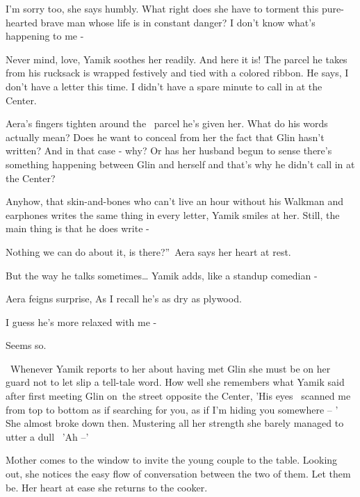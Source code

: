 \documentclass[12pt]{book}
\begin{document}
{\textquotedbl}I'm sorry too,{\textquotedbl} she says humbly. What right does she have to torment this pure-hearted
brave man whose life is in constant danger? {\textquotedbl}I don't know what's happening to me -{\textquotedbl}

{\textquotedbl}Never mind, love,{\textquotedbl} Yamik soothes her readily. {\textquotedbl}And here it is!{\textquotedbl}
The parcel he takes from his rucksack is wrapped festively and tied with a colored ribbon. He says, {\textquotedbl}I
don't have a letter this time. I didn't have a spare minute to call in at the Center.{\textquotedbl}

Aera's fingers tighten around the \ parcel he's given her. What do his words actually mean? Does he want to conceal from
her the fact that Glin hasn't written? And in that case - why? Or has her husband begun to sense there's something
happening between Glin and herself and that's why he didn't call in at the Center?

{\textquotedbl}Anyhow, that skin-and-bones who can't live an hour without his Walkman and earphones writes the same
thing in every letter, {\textquotedbl} Yamik smiles at her. {\textquotedbl}Still, the main thing is that he does write
-{\textquotedbl}

{\textquotedbl}Nothing we can do about it, is there?''~Aera says her heart at rest.

{\textquotedbl}But the way he talks sometimes{\dots}{\textquotedbl} Yamik adds, {\textquotedbl}like a standup comedian
-{\textquotedbl}

Aera feigns surprise, {\textquotedbl}As I recall he's as dry as plywood.{\textquotedbl}

{\textquotedbl}I guess he's more relaxed with me -{\textquotedbl}

{\textquotedbl}Seems so.{\textquotedbl}

\ Whenever Yamik reports to her about having met Glin she must be on her guard not to let slip a tell-tale word. How
well she remembers what Yamik said after first meeting Glin on~the street opposite the Center, 'His eyes \ scanned me
from top to bottom as if searching for you, as if I'm hiding you somewhere -- ' She almost broke down then. Mustering
all her strength she barely managed to utter a dull~ 'Ah --'

Mother comes to the window to invite the young couple to the table. Looking out, she{ }notices the easy
flow of conversation between the two of them. Let them be. Her heart at ease she returns to the cooker.
\end{document}
